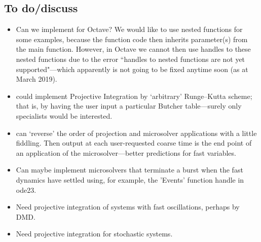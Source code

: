 \begin{devMan}
%






\section{To do/discuss}
\begin{itemize}
\item Can we implement for Octave?  We would like to use nested functions for some examples, because the function code then inherits parameter(s) from the main function.  However, in Octave we cannot then use handles to these nested functions due to the error ``handles to nested functions are not yet supported"---which apparently is not going to be fixed anytime soon (as at March 2019).

\item could implement Projective Integration by `arbitrary' Runge--Kutta scheme; that is, by having the user input a particular Butcher table---surely only specialists would be interested.

\item can `reverse' the order of projection and microsolver applications with a little fiddling.
Then output at each user-requested coarse time is the end point of an application of the microsolver---better predictions for fast variables.

\item Can maybe implement microsolvers that terminate a burst when the fast dynamics have settled using, for example, the 'Events' function handle in ode23. 

\item Need projective integration of systems with fast oscillations, perhaps by DMD.

\item Need projective integration for stochastic systems.

\end{itemize}
\end{devMan}


